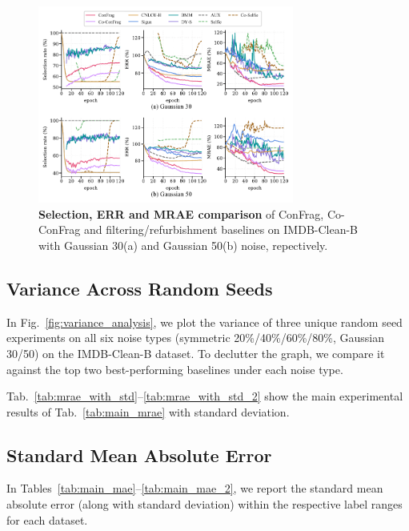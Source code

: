 \documentclass{article}
\theoremstyle{plain}
\theoremstyle{definition}
\theoremstyle{remark}
\begin{document}
\begin{figure}[th]
\begin{center}
\centerline{\includegraphics[width=0.75\textwidth]{imgs/selerr_comparison_supp2_neurips.pdf}}
\caption{\textbf{Selection, ERR and MRAE comparison} of ConFrag, Co-ConFrag and filtering/refurbishment baselines on IMDB-Clean-B
with Gaussian 30(a) and Gaussian 50(b) noise, repectively.
}
\label{fig:selerr_comparison_supp2}
\end{center}
\end{figure}

\subsection{Variance Across Random Seeds}\label{subsec:variance}
In Fig.~\ref{fig:variance_analysis}, we plot the variance of three unique random seed experiments on all six noise types (symmetric 20\%/40\%/60\%/80\%, Gaussian 30/50) 
on the IMDB-Clean-B dataset. To declutter the graph, we compare it against the top two best-performing baselines under each noise type.

Tab.~\ref{tab:mrae_with_std}--\ref{tab:mrae_with_std_2} show the main experimental results of Tab.~\ref{tab:main_mrae} with standard deviation.



\subsection{Standard Mean Absolute Error}\label{subsec:mae}
In Tables~\ref{tab:main_mae}--\ref{tab:main_mae_2}, we report the standard mean absolute error (along with standard deviation) within the respective label ranges for each dataset.
\end{document}
